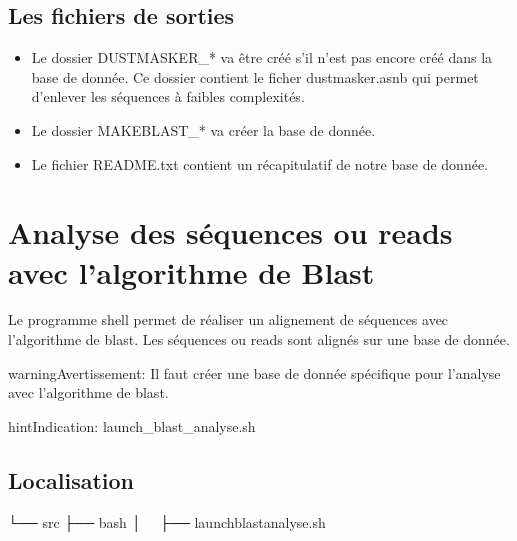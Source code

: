 \documentclass[letterpaper,10pt,french]{sphinxmanual}
\begin{document}
\subsection{Les fichiers de sorties}
\label{\detokenize{bash/create_blast_database_without_low_complexity.sh:les-fichiers-de-sorties}}\begin{itemize}
\item {} 
Le dossier DUSTMASKER\_* va être créé s’il n’est pas encore créé dans la base de donnée. Ce dossier contient le ficher dustmasker.asnb qui permet d’enlever les séquences à faibles complexités.

\item {} 
Le dossier MAKEBLAST\_* va créer la base de donnée.

\item {} 
Le fichier README.txt contient un récapitulatif de notre base de donnée.

\end{itemize}


\section{Analyse des séquences ou reads avec l’algorithme de Blast}
\label{\detokenize{bash/launch_blast_analyse.sh:analyse-des-sequences-ou-reads-avec-l-algorithme-de-blast}}\label{\detokenize{bash/launch_blast_analyse.sh::doc}}
Le programme shell permet de réaliser un alignement de séquences avec l’algorithme de blast. Les séquences ou reads sont alignés sur une base de donnée.

\begin{sphinxadmonition}{warning}{Avertissement:}
Il faut créer une base de donnée spécifique pour l’analyse avec l’algorithme de blast.
\end{sphinxadmonition}

\begin{sphinxadmonition}{hint}{Indication:}
launch\_blast\_analyse.sh
\end{sphinxadmonition}


\subsection{Localisation}
\label{\detokenize{bash/launch_blast_analyse.sh:localisation}}
\begin{sphinxVerbatim}[commandchars=\\\{\}]
└── src
 ├── bash
 │   ├── launch\PYGZus{}blast\PYGZus{}analyse.sh
\end{sphinxVerbatim}
\end{document}
